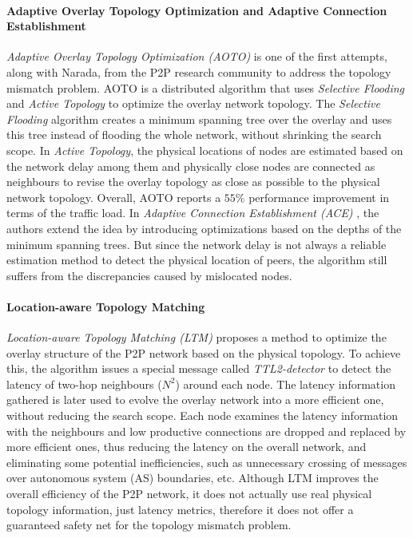 \paragraph*{\bf Adaptive Overlay Topology Optimization and Adaptive Connection
Establishment}
\emph{Adaptive Overlay Topology Optimization (AOTO)} \cite{liu_auto_2003} is one
of the first attempts, along with Narada, from the P2P research community to
address the topology mismatch problem. AOTO is a distributed algorithm that uses
\emph{Selective Flooding} and \emph{Active Topology} to optimize the overlay
network topology. The \emph{Selective Flooding} algorithm creates a minimum
spanning tree over the overlay and uses this tree instead of flooding the whole
network, without shrinking the search scope. In \emph{Active Topology}, the
physical locations of nodes are estimated based on the network delay among them
and physically close nodes are connected as neighbours to revise the overlay
topology as close as possible to the physical network topology. Overall, AOTO
reports a $55\%$ performance improvement in terms of the traffic load. In
\emph{Adaptive Connection Establishment (ACE)} \cite{liu_ace_2004}, the authors
extend the idea by introducing optimizations based on the depths of the minimum
spanning trees. But since the network delay is not always a reliable estimation
method to detect the physical location of peers, the algorithm still suffers
from the discrepancies caused by mislocated nodes.

\paragraph*{\bf Location-aware Topology Matching}
\emph{Location-aware Topology Matching (LTM)} \cite{liu_ltm_2004} proposes a
method to optimize the overlay structure of the P2P network based on the
physical topology. To achieve this, the algorithm issues a special message
called \textit{TTL2-detector} to detect the latency of two-hop neighbours
($N^2$) around each node. The latency information gathered is later used to
evolve the overlay network into a more efficient one, without reducing the
search scope. Each node examines the latency information with the neighbours and
low productive connections are dropped and replaced by more efficient ones, thus
reducing the latency on the overall network, and eliminating some potential
inefficiencies, such as unnecessary crossing of messages over autonomous system
(AS) boundaries, etc. Although LTM improves the overall efficiency of the P2P
network, it does not actually use real physical topology information, just
latency metrics, therefore it does not offer a guaranteed safety net for the
topology mismatch problem.

